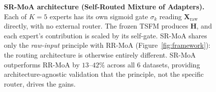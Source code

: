 \documentclass{article}
\begin{document}
\begin{figure}[!htbp]
{%
}
\caption{\textbf{SR-MoA architecture (Self-Routed Mixture of Adapters).} Each of $K{=}5$ experts has its own sigmoid gate $\sigma_k$ reading $\mathbf{X}_\mathrm{raw}$ directly, with no external router. The frozen TSFM produces $\mathbf{H}$, and each expert's contribution is scaled by its self-gate. SR-MoA shares only the \emph{raw-input} principle with RR-MoA (Figure~\ref{fig:framework}): the routing architecture is otherwise entirely different. SR-MoA outperforms RR-MoA by $13$--$42\%$ across all 6 datasets, providing architecture-agnostic validation that the principle, not the specific router, drives the gains.}
\label{fig:srmoa_arch}
\end{figure}
\end{document}
